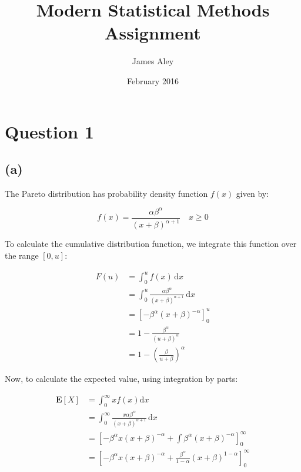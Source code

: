 \documentclass{article}
\title{Modern Statistical Methods Assignment}
\author{James Aley}
\date{February 2016}
\begin{document}
\maketitle

\section*{Question 1}

\subsection*{(a)}

The Pareto distribution has probability density function $f(x)$ given by:

\begin{displaymath}
  f(x) = \frac{\alpha \beta^{\alpha}}{{(x + \beta)}^{\alpha + 1}} \quad x \geq 0
\end{displaymath}

To calculate the cumulative distribution function, we integrate this
function over the range $\left[ 0, u \right]$:

\begin{align*}
  F(u) &= \int_0^u f(x) \, \mathrm{d}x \\
       &= \int_0^u \frac{\alpha \beta^{\alpha}}
                            {{(x + \beta)}^{\alpha + 1}}
         \, \mathrm{d}x \\
       &= {\left[ - \beta^\alpha {(x + \beta)}^{-\alpha}  \right]}_0^u \\
       &= 1 - \frac{\beta^{\alpha}}{{(u + \beta)}^\alpha} \\
       &= 1 - {\left( \frac{\beta}{u + \beta} \right)}^{\alpha}
\end{align*}

Now, to calculate the expected value, using integration by parts:

\begin{align*}
  \mathbf{E}\left[X\right] &= \int_0^{\infty} x f(x) \mathrm{d}x \\
                           &= \int_0^{\infty} \frac{x \alpha \beta^{\alpha}}
                             {{(x + \beta)}^{\alpha + 1}}
                             \, \mathrm{d}x \\
                           &= {\left[
                             - \beta^\alpha x {(x + \beta)}^{-\alpha}
                             + \int \beta^{\alpha} {(x + \beta)}^{- \alpha}
                             \right]}_0^{\infty} \\
                           &= {\left[
                             - \beta^\alpha x {(x + \beta)}^{-\alpha}
                             + \frac{\beta^{\alpha}}{1 - \alpha}
                             {\left( x + \beta \right)}^{1 - \alpha}
                             \right]}_0^{\infty} \\
\end{align*}
\end{document}
